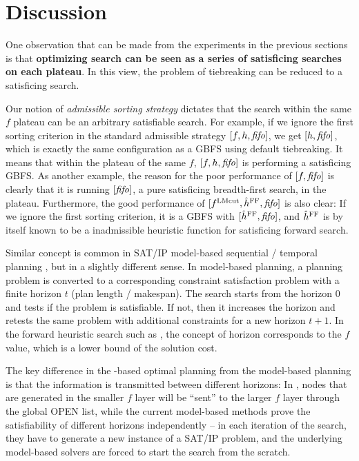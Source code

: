 \clearpage 
\section{Discussion}
\label{sec:discussion}

One observation that can be made from the experiments in the previous sections is that \textbf{optimizing search
can be seen as a series of satisficing searches on each plateau}. In this view, the problem of tiebreaking can be
reduced to a satisficing search.

Our notion of \emph{admissible sorting strategy} dictates that the
search within the same $f$ plateau can be an arbitrary satisfiable search. For example,
if we ignore the first sorting criterion in the standard admissible strategy
$[f,h,{\text{\textit{fifo}}}]$, we get $[h,{\text{\textit{fifo}}}]$, which is exactly
the same configuration as a GBFS using \fifo default tiebreaking. It
means that within the plateau of the same $f$, $[f,h,{\text{\textit{fifo}}}]$ is
performing a satisficing GBFS.
As another example, the reason for the poor performance of $[f,{\text{\textit{fifo}}}]$
is clearly that it is running $[{\text{\textit{fifo}}}]$,
a pure satisficing breadth-first search, in the plateau.
Furthermore, the good performance of $[f^{\text{LMcut}},\hat{h}^{\text{FF}},{\text{\textit{fifo}}}]$ is also clear:
If we ignore the first sorting criterion, it is a GBFS with $[\hat{h}^{\text{FF}},{\text{\textit{fifo}}}]$,
and $\hat{h}^{\text{FF}}$ is by itself known to be a \sota inadmissible heuristic
function for satisficing forward search.

Similar concept is common in SAT/IP model-based sequential / temporal planning
\cite{rintanen2012planning,van2005optiplan}, but in a slightly different sense.  In model-based planning, a
planning problem is converted to a corresponding constraint satisfaction problem with a finite horizon $t$ (plan
length / makespan). The search starts from the horizon 0 and tests if the problem is satisfiable. If not, then it
increases the horizon and retests the same problem with additional constraints for a new horizon $t+1$. In the
forward heuristic search such as \astar, the concept of horizon corresponds to the $f$ value, which is a lower
bound of the solution cost.

The key difference in the \astar-based optimal planning from the model-based planning is
that the information is transmitted between different horizons:
In \astar, nodes that are generated in the smaller
$f$ layer will be ``sent'' to the larger $f$ layer through the global OPEN
list, while the current model-based methods prove the satisfiability of
different horizons independently -- in each iteration of the search,
they have to generate a new instance of a SAT/IP problem, and the
underlying model-based solvers are forced to start the search from the scratch.

